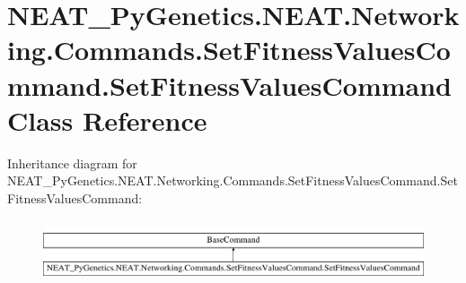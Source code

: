 \hypertarget{class_n_e_a_t___py_genetics_1_1_n_e_a_t_1_1_networking_1_1_commands_1_1_set_fitness_values_comma81a16061636d0840e697e190c694b7ad}{}\section{N\+E\+A\+T\+\_\+\+Py\+Genetics.\+N\+E\+A\+T.\+Networking.\+Commands.\+Set\+Fitness\+Values\+Command.\+Set\+Fitness\+Values\+Command Class Reference}
\label{class_n_e_a_t___py_genetics_1_1_n_e_a_t_1_1_networking_1_1_commands_1_1_set_fitness_values_comma81a16061636d0840e697e190c694b7ad}
Inheritance diagram for N\+E\+A\+T\+\_\+\+Py\+Genetics.\+N\+E\+A\+T.\+Networking.\+Commands.\+Set\+Fitness\+Values\+Command.\+Set\+Fitness\+Values\+Command\+:\begin{figure}[H]
\begin{center}
\leavevmode
\includegraphics[height=1.851240cm]{class_n_e_a_t___py_genetics_1_1_n_e_a_t_1_1_networking_1_1_commands_1_1_set_fitness_values_comma81a16061636d0840e697e190c694b7ad}
\end{center}
\end{figure}
